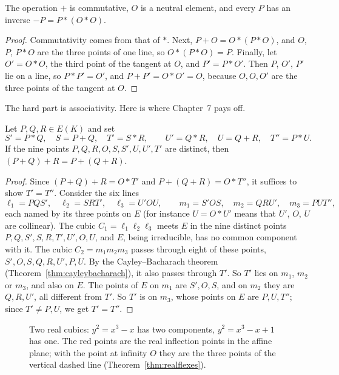\begin{proposition}\label{prop:groupbasic}
The operation $+$ is commutative, $O$ is a neutral element, and every $P$ has an inverse $-P=P*(O*O)$.
\end{proposition}

\begin{proof}
Commutativity comes from that of $*$. Next, $P+O=O*(P*O)$, and $O$, $P$, $P*O$ are the three points of one line, so $O*(P*O)=P$. Finally, let $O'=O*O$, the
third point of the tangent at $O$, and $P'=P*O'$. Then $P$, $O'$, $P'$ lie on a line, so $P*P'=O'$, and $P+P'=O*O'=O$, because $O,O,O'$ are the three points
of the tangent at $O$.
\end{proof}

The hard part is associativity. Here is where Chapter~7 pays off.

\begin{theorem}[associativity]\label{thm:assoc}
Let $P,Q,R\in E(K)$ and set
\[
S'=P*Q,\quad S=P+Q,\quad T'=S*R,\qquad U'=Q*R,\quad U=Q+R,\quad T''=P*U.
\]
If the nine points $P,Q,R,O,S,S',U,U',T'$ are distinct, then $(P+Q)+R=P+(Q+R)$.
\end{theorem}

\begin{proof}
Since $(P+Q)+R=O*T'$ and $P+(Q+R)=O*T''$, it suffices to show $T'=T''$. Consider the six lines
\[
\ell_1=PQS',\quad \ell_2=SRT',\quad \ell_3=U'OU,\qquad m_1=S'OS,\quad m_2=QRU',\quad m_3=PUT'',
\]
each named by its three points on $E$ (for instance $U=O*U'$ means that $U'$, $O$, $U$ are collinear). The cubic $C_1=\ell_1\ell_2\ell_3$ meets $E$ in the nine
distinct points $P,Q,S',S,R,T',U',O,U$, and $E$, being irreducible, has no common component with it. The cubic $C_2=m_1m_2m_3$ passes through eight of these
points, $S',O,S,Q,R,U',P,U$. By the Cayley--Bacharach theorem (Theorem~\ref{thm:cayleybacharach}), it also passes through $T'$. So $T'$ lies on $m_1$, $m_2$
or $m_3$, and also on $E$. The points of $E$ on $m_1$ are $S',O,S$, and on $m_2$ they are $Q,R,U'$, all different from $T'$. So $T'$ is on $m_3$, whose points on
$E$ are $P,U,T''$; since $T'\ne P,U$, we get $T'=T''$.
\end{proof}

\begin{figure}[ht]
\centering
{}
\caption{Two real cubics: $y^2=x^3-x$ has two components, $y^2=x^3-x+1$ has one. The red points are the real inflection points in the affine plane; with
the point at infinity $O$ they are the three points of the vertical dashed line (Theorem~\ref{thm:realflexes}).}
\label{fig:realcubics}
\end{figure}

